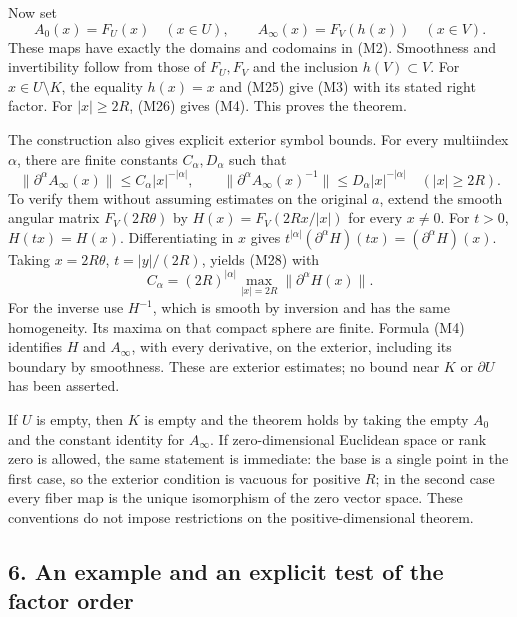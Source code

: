 \documentclass[
  11pt,
]{article}
\begin{document}
Now set \[
A_0(x)=F_U(x)\quad(x\in U),
\qquad
A_\infty(x)=F_V(h(x))\quad(x\in V).
\tag{M27}
\] These maps have exactly the domains and codomains in (M2). Smoothness
and invertibility follow from those of \(F_U,F_V\) and the inclusion
\(h(V)\subset V\). For \(x\in U\setminus K\), the equality \(h(x)=x\)
and (M25) give (M3) with its stated right factor. For \(|x|\geq2R\),
(M26) gives (M4). This proves the theorem.

The construction also gives explicit exterior symbol bounds. For every
multiindex \(\alpha\), there are finite constants \(C_\alpha,D_\alpha\)
such that \[
\|\partial^\alpha A_\infty(x)\|
 \leq C_\alpha |x|^{-|\alpha|},\qquad
\|\partial^\alpha A_\infty(x)^{-1}\|
 \leq D_\alpha |x|^{-|\alpha|}
\quad(|x|\geq2R).
\tag{M28}
\] To verify them without assuming estimates on the original \(a\),
extend the smooth angular matrix \(F_V(2R\theta)\) by
\(H(x)=F_V(2Rx/|x|)\) for every \(x\ne0\). For \(t>0\), \(H(tx)=H(x)\).
Differentiating in \(x\) gives
\(t^{|\alpha|}(\partial^\alpha H)(tx)=(\partial^\alpha H)(x)\). Taking
\(x=2R\theta\), \(t=|y|/(2R)\), yields (M28) with \[
C_\alpha=(2R)^{|\alpha|}
\max_{|x|=2R}\|\partial^\alpha H(x)\|.
\tag{M29}
\] For the inverse use \(H^{-1}\), which is smooth by inversion and has
the same homogeneity. Its maxima on that compact sphere are finite.
Formula (M4) identifies \(H\) and \(A_\infty\), with every derivative,
on the exterior, including its boundary by smoothness. These are
exterior estimates; no bound near \(K\) or \(\partial U\) has been
asserted.

If \(U\) is empty, then \(K\) is empty and the theorem holds by taking
the empty \(A_0\) and the constant identity for \(A_\infty\). If
zero-dimensional Euclidean space or rank zero is allowed, the same
statement is immediate: the base is a single point in the first case, so
the exterior condition is vacuous for positive \(R\); in the second case
every fiber map is the unique isomorphism of the zero vector space.
These conventions do not impose restrictions on the positive-dimensional
theorem.

\subsection{6. An example and an explicit test of the factor
order}\label{an-example-and-an-explicit-test-of-the-factor-order}
\end{document}
